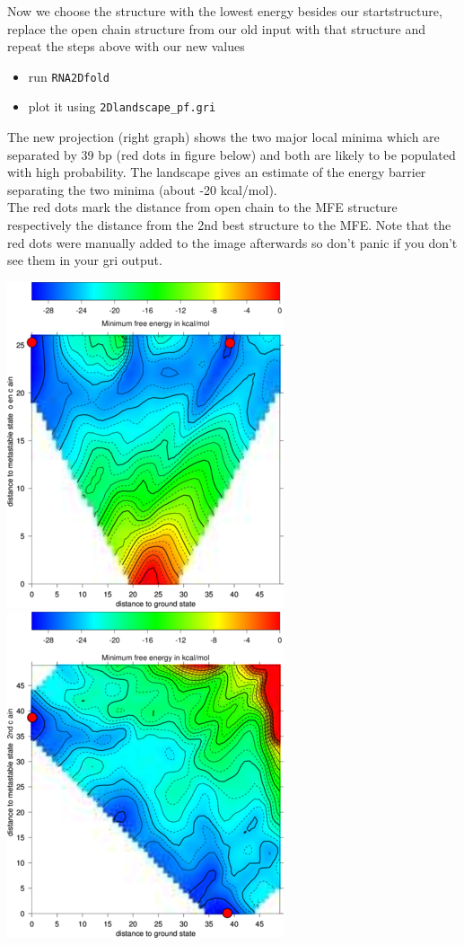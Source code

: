\documentclass[]{article}
\providecommand{\tightlist}{%
  \setlength{\itemsep}{0pt}\setlength{\parskip}{0pt}}
\begin{document}
Now we choose the structure with the lowest energy besides our
startstructure, replace the open chain structure from our old input with
that structure and repeat the steps above with our new values

\begin{itemize}
\tightlist
\item
  run \texttt{RNA2Dfold}
\item
  plot it using \texttt{2Dlandscape\_pf.gri}\\
\end{itemize}

The new projection (right graph) shows the two major local minima which
are separated by 39 bp (red dots in figure below) and both are likely to
be populated with high probability. The landscape gives an estimate of
the energy barrier separating the two minima (about -20 kcal/mol).\\
The red dots mark the distance from open chain to the MFE structure
respectively the distance from the 2nd best structure to the MFE. Note
that the red dots were manually added to the image afterwards so don't
panic if you don't see them in your gri output.

\includegraphics{Figs/2dfold_out_m.png}
\includegraphics{Figs/2dfold_2_out_m.png}
\end{document}
